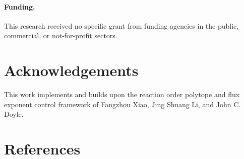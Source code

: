 \documentclass[11pt]{article}
\begin{document}
\paragraph{Funding.} This research received no specific grant from funding agencies in the
public, commercial, or not-for-profit sectors.

\section*{Acknowledgements}
This work implements and builds upon the reaction order polytope and flux exponent control
framework of Fangzhou Xiao, Jing Shuang Li, and John C. Doyle.

\section*{References}
\end{document}
